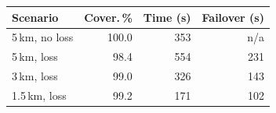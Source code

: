 \begin{tabular}{lrrr}
\toprule
Scenario & Cover.\,\% & Time (s) & Failover (s)\\
\midrule
5\,km, no loss & 100.0 & 353 & n/a \\
5\,km, loss & 98.4 & 554 & 231 \\
3\,km, loss & 99.0 & 326 & 143 \\
1.5\,km, loss & 99.2 & 171 & 102 \\
\bottomrule
\end{tabular}

